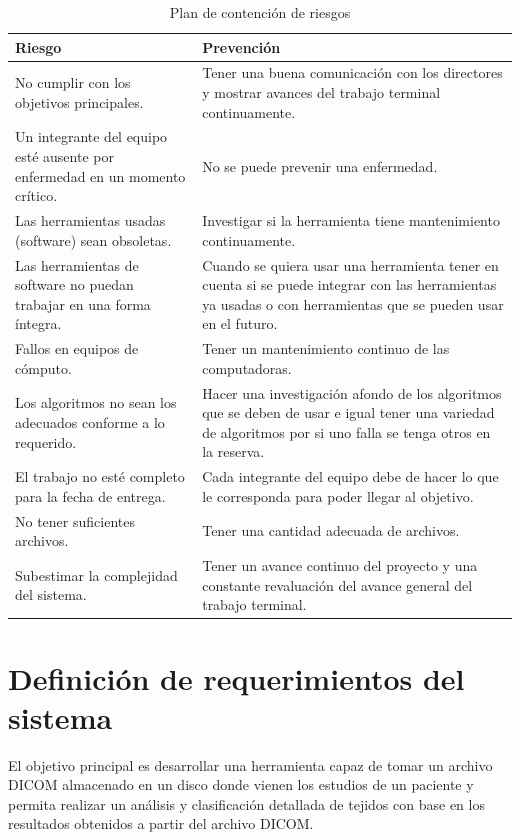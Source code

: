 \documentclass[12pt]{report}
\begin{document}
\begin{table}[H]
\begin{center}
\begin{tabular}{|p{70mm}|p{70mm}|}
\hline
 Riesgo & Prevención \\
\hline \hline 
No cumplir con los objetivos principales. & Tener una buena comunicación con los directores y mostrar avances del trabajo terminal continuamente.\\
\hline
Un integrante del equipo esté ausente por enfermedad en un momento crítico. & No se puede prevenir una enfermedad.\\
\hline
Las herramientas usadas (software) sean obsoletas. & Investigar si la herramienta tiene mantenimiento continuamente. \\
\hline
Las herramientas de software no puedan trabajar en una forma íntegra. & Cuando se quiera usar una herramienta tener en cuenta si se puede integrar con las herramientas ya usadas o con herramientas que se pueden usar en el futuro.\\
\hline
Fallos en equipos de cómputo. & Tener un mantenimiento continuo de las computadoras.\\
\hline
Los algoritmos no sean los adecuados conforme a lo requerido. & Hacer una investigación afondo de los algoritmos que se deben de usar e igual tener una variedad de algoritmos por si uno falla se tenga otros en la reserva.\\
\hline
El trabajo no esté completo para la fecha de entrega. & Cada integrante del equipo debe de hacer lo que le corresponda para poder llegar al objetivo.\\
\hline
No tener suficientes archivos. & Tener una cantidad adecuada de archivos. \\
\hline
Subestimar la complejidad del sistema. & Tener un avance continuo del proyecto y una constante revaluación del avance general del trabajo terminal.\\
\hline
\end{tabular}
\caption{Plan de contención de riesgos}
\end{center}
\end{table}


\section{Definición de requerimientos del sistema}
El objetivo principal es desarrollar una herramienta capaz de tomar un archivo DICOM almacenado en un disco donde vienen los estudios de un paciente y permita realizar un análisis y clasificación detallada de tejidos con base en los resultados obtenidos a partir del archivo DICOM.\\ 
\end{document}
